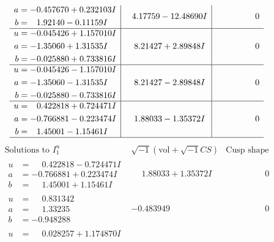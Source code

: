 \documentclass[1p]{elsarticle_modified}
\theoremstyle{definition}
\newcommand{\I}{\sqrt{-1}}
\begin{document}
$$\begin{array}{c|c|c}
\begin{aligned}
a &= -0.457670 + 0.232103 I \\
b &= \phantom{-}1.92140 - 0.11159 I\end{aligned}
 & \phantom{-}4.17759 - 12.48690 I & \phantom{-0.000000 } 0 \\ \hline\begin{aligned}
u &= -0.045426 + 1.157010 I \\
a &= -1.35060 + 1.31535 I \\
b &= -0.025880 + 0.733816 I\end{aligned}
 & \phantom{-}8.21427 + 2.89848 I & \phantom{-0.000000 } 0 \\ \hline\begin{aligned}
u &= -0.045426 - 1.157010 I \\
a &= -1.35060 - 1.31535 I \\
b &= -0.025880 - 0.733816 I\end{aligned}
 & \phantom{-}8.21427 - 2.89848 I & \phantom{-0.000000 } 0 \\ \hline\begin{aligned}
u &= \phantom{-}0.422818 + 0.724471 I \\
a &= -0.766881 - 0.223474 I \\
b &= \phantom{-}1.45001 - 1.15461 I\end{aligned}
 & \phantom{-}1.88033 - 1.35372 I & \phantom{-0.000000 } 0\\
 \hline 
 \end{array}$$\newpage$$\begin{array}{c|c|c}  
\text{Solutions to }I^u_{1}& \I (\text{vol} + \sqrt{-1}CS) & \text{Cusp shape}\\
 \hline 
\begin{aligned}
u &= \phantom{-}0.422818 - 0.724471 I \\
a &= -0.766881 + 0.223474 I \\
b &= \phantom{-}1.45001 + 1.15461 I\end{aligned}
 & \phantom{-}1.88033 + 1.35372 I & \phantom{-0.000000 } 0 \\ \hline\begin{aligned}
u &= \phantom{-}0.831342\phantom{ +0.000000I} \\
a &= \phantom{-}1.33235\phantom{ +0.000000I} \\
b &= -0.948288\phantom{ +0.000000I}\end{aligned}
 & -0.483949\phantom{ +0.000000I} & \phantom{-0.000000 } 0 \\ \hline\begin{aligned}
u &= \phantom{-}0.028257 + 1.174870 I \\

\end{aligned}
\end{array}$$
\end{document}
